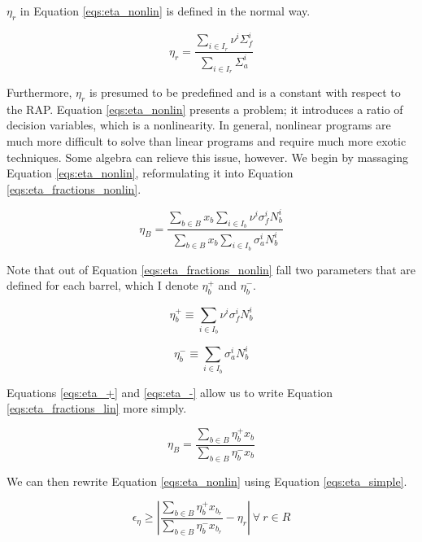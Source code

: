 $\eta_{r}$ in Equation \ref{eqs:eta_nonlin} is defined in the normal way.

\begin{equation}
\label{eqs:eta_r}
\eta_{r} = \frac{\sum_{i \in I_{r}} \nu^{i} \Sigma_{f}^{i}}
                {\sum_{i \in I_{r}} \Sigma_{a}^{i}}
\end{equation}

Furthermore, $\eta_{r}$ is presumed to be predefined and is a constant with
respect to the RAP. Equation \ref{eqs:eta_nonlin} presents a problem; it
introduces a ratio of decision variables, which is a nonlinearity. In general,
nonlinear programs are much more difficult to solve than linear programs and
require much more exotic techniques. Some algebra can relieve this issue,
however. We begin by massaging Equation \ref{eqs:eta_nonlin}, reformulating it
into Equation \ref{eqs:eta_fractions_nonlin}.

\begin{equation}
\label{eqs:eta_fractions_lin}
\eta_{B} = \frac{\sum_{b \in B} x_{b} \sum_{i \in I_{b}} \nu^{i} \sigma_{f}^{i} N_{b}^{i}}
                {\sum_{b \in B} x_{b} \sum_{i \in I_{b}} \sigma_{a}^{i} N_{b}^{i}}
\end{equation}

Note that out of Equation \ref{eqs:eta_fractions_nonlin} fall two parameters
that are defined for each barrel, which I denote $\eta_{b}^{+}$ and
$\eta_{b}^{-}$.

\begin{equation}
\label{eqs:eta_+}
\eta_{b}^{+} \equiv \sum_{i \in I_{b}} \nu^{i} \sigma_{f}^{i} N_{b}^{i}
\end{equation}

\begin{equation}
\label{eqs:eta_-}
\eta_{b}^{-} \equiv \sum_{i \in I_{b}} \sigma_{a}^{i} N_{b}^{i}
\end{equation}

Equations \ref{eqs:eta_+} and \ref{eqs:eta_-} allow us to write
Equation \ref{eqs:eta_fractions_lin} more simply.

\begin{equation}
\label{eqs:eta_simple}
\eta_{B} = \frac{\sum_{b \in B} \eta_{b}^{+} x_{b}}
                {\sum_{b \in B} \eta_{b}^{-} x_{b}}
\end{equation}

We can then rewrite Equation \ref{eqs:eta_nonlin} using
Equation \ref{eqs:eta_simple}.

\begin{equation}
\label{eqs:eta_nonlin_simple}
\epsilon_{\eta} \geq \left| 
\frac{\sum_{b \in B} \eta_{b}^{+} x_{b_r}}
     {\sum_{b \in B} \eta_{b}^{-} x_{b_r}}
- \eta_{r} \right|
\: \forall \: r \in R
\end{equation}


